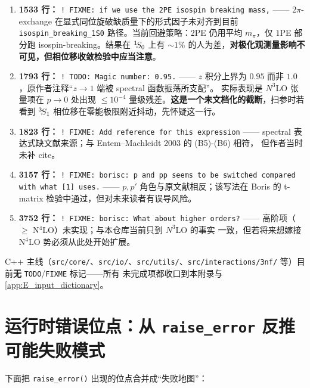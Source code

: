 \begin{enumerate}
  \item \textbf{1533 行：} \texttt{! FIXME: if we use the 2PE isospin breaking mass,} —— 2\(\pi\)-exchange 在显式同位旋破缺质量下的形式因子未对齐到目前
        \texttt{isospin\_breaking\_1S0} 路径。当前回避策略：\(2\)PE 仍用平均 \(m_\pi\)，仅 \(1\)PE 部分跑 isospin-breaking。结果在 \({}^{1}\!S_{0}\) 上有
        \(\sim 1\%\) 的人为差，\textbf{对极化观测量影响不可见，但相位移收敛检验中应当注意}。
  \item \textbf{1793 行：} \texttt{! TODO: Magic number: 0.95.} —— \(z\) 积分上界为 \(0.95\) 而非 \(1.0\)，原作者注释“\(z\to 1\) 端被 spectral 函数振荡所支配”。
        实际表现是 \(N^3\)LO 张量项在 \(p\to 0\) 处出现 \(\le 10^{-4}\) 量级残差。\textbf{这是一个未文档化的截断}，扫参时若看到 \({}^{3}\!S_{1}\)
        相位移在零能极限附近抖动，先怀疑这一行。
  \item \textbf{1823 行：} \texttt{! FIXME: Add reference for this expression} —— spectral 表达式缺文献来源；与 Entem--Machleidt 2003 的 (B5)-(B6) 相符，
        但作者当时未补 cite。
  \item \textbf{3157 行：} \texttt{! FIXME: borisc: p and pp seems to be switched compared with what [1] uses.} —— \(p,p'\) 角色与原文献相反；该写法在
        Boris 的 t-matrix 检验中通过，但对未来读者有误导风险。
  \item \textbf{3752 行：} \texttt{! FIXME: borisc: What about higher orders?} —— 高阶项（\(\ge\) N\(^4\)LO）未实现；与本仓库当前只到 \(N^3\)LO 的事实
        一致，但若将来想嫁接 N\(^4\)LO 势必须从此处开始扩展。
\end{enumerate}

C++ 主线（\texttt{src/core/}、\texttt{src/io/}、\texttt{src/utils/}、\texttt{src/interactions/3nf/} 等）目前\textbf{无} \texttt{TODO}/\texttt{FIXME} 标记——所有
未完成项都收口到本附录与 \cref{app:E_input_dictionary}。

\section{运行时错误位点：从 \texttt{raise\_error} 反推可能失败模式}
\label{sec:appF_raise_sites}

下面把 \texttt{raise\_error()} 出现的位点合并成“失败地图”：

